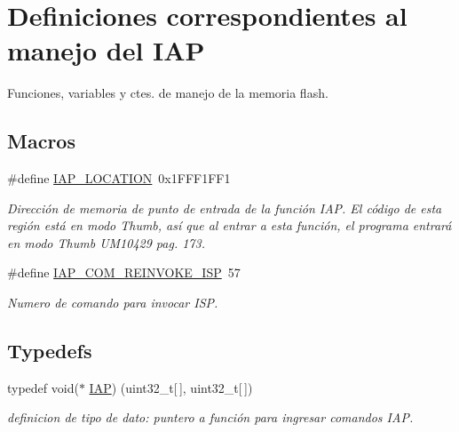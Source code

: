 \hypertarget{group___i_a_p}{}\section{Definiciones correspondientes al manejo del I\+AP}
\label{group___i_a_p}


Funciones, variables y ctes. de manejo de la memoria flash.  


\subsection*{Macros}
\begin{DoxyCompactItemize}
\item 
\#define \hyperlink{group___i_a_p_ga381a9caf5bf2ed4a883cddaf17eef87d}{I\+A\+P\+\_\+\+L\+O\+C\+A\+T\+I\+ON}~0x1\+F\+F\+F1\+F\+F1
\begin{DoxyCompactList}\small\item\em Dirección de memoria de punto de entrada de la función I\+AP. El código de esta región está en modo Thumb, así que al entrar a esta función, el programa entrará en modo Thumb U\+M10429 pag. 173. \end{DoxyCompactList}\item 
\#define \hyperlink{group___i_a_p_ga13eaec047c94fd8622da485175eee25f}{I\+A\+P\+\_\+\+C\+O\+M\+\_\+\+R\+E\+I\+N\+V\+O\+K\+E\+\_\+\+I\+SP}~57
\begin{DoxyCompactList}\small\item\em Numero de comando para invocar I\+SP. \end{DoxyCompactList}\end{DoxyCompactItemize}
\subsection*{Typedefs}
\begin{DoxyCompactItemize}
\item 
typedef void($\ast$ \hyperlink{group___i_a_p_ga2874bcf0af02828d8bf944fd740ac986}{I\+AP}) (uint32\+\_\+t\mbox{[}$\,$\mbox{]}, uint32\+\_\+t\mbox{[}$\,$\mbox{]})
\begin{DoxyCompactList}\small\item\em definicion de tipo de dato\+: puntero a función para ingresar comandos I\+AP. \end{DoxyCompactList}\end{DoxyCompactItemize}


